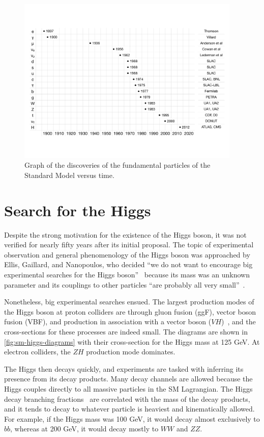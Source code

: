 \begin{figure}[tp]
  \centering
  \includegraphics[width=0.95\textwidth]{figures/standardmodel/discoveries}
  \caption{Graph of the discoveries of the fundamental particles of the Standard Model versus time.}
  \label{fig:sm-particles-2}
\end{figure}

\section{Search for the Higgs}

Despite the strong motivation for the existence of the Higgs boson, it was not verified for nearly fifty years after its initial proposal. The topic of experimental observation and general phenomenology of the Higgs boson was approached by Ellis, Gaillard, and Nanopoulos, who decided ``we do not want to encourage big experimental searches for the Higgs boson''~\cite{1976.higgspheno} because its mass was an unknown parameter and its couplings to other particles ``are probably all very small''~\cite{1976.higgspheno}.

Nonetheless, big experimental searches ensued. The largest production modes of the Higgs boson at proton colliders are through gluon fusion (ggF), vector boson fusion (VBF), and production in association with a vector boson ($VH$)~\cite{1984.vbf}, and the cross-sections for these processes are indeed small. The diagrams are shown in \cref{fig:sm-higgs-diagrams} with their cross-section for the Higgs mass at 125 GeV. At electron colliders, the $ZH$ production mode dominates. 

The Higgs then decays quickly, and experiments are tasked with inferring its presence from its decay products. Many decay channels are allowed because the Higgs couples directly to all massive particles in the SM Lagrangian. The Higgs decay branching fractions~\cite{1997.hdecay} are correlated with the mass of the decay products, and it tends to decay to whatever particle is heaviest and kinematically allowed. For example, if the Higgs mass was 100 GeV, it would decay almost exclusively to $bb$, whereas at 200 GeV, it would decay mostly to $WW$ and $ZZ$.

